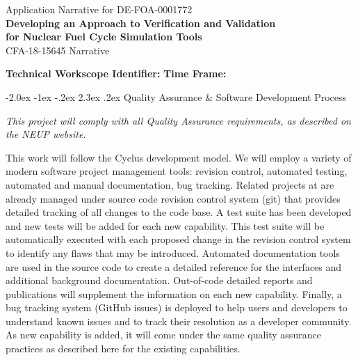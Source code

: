 \documentclass[dvips,12pt]{article}
\makeatletter
\renewcommand\section{\@startsection {section}{1}{\z@}%
                                   {-2.0ex \@plus -1ex \@minus -.2ex}%
                                   {2.3ex \@plus.2ex}%
                                   {\normalfont\bfseries}}%
\makeatother
\begin{document}
\begin{centering} Application Narrative for
  DE-FOA-0001772\\
  \textbf{\large Developing an Approach to Verification and Validation\\ for Nuclear Fuel Cycle Simulation Tools}\\
  CFA-18-15645 Narrative\\
\end{centering}

\vspace{1em}

\noindent\textbf{Technical Workscope Identifier:}  \hspace{1.5in}
\textbf{Time Frame:}







%

\section{Quality Assurance \& Software Development Process}

\textit{This project will comply with all Quality Assurance requirements, as
described on the NEUP website.}

This work will follow the Cyclus development model.  We will employ a variety of
modern software project management tools: revision control, automated testing,
automated and manual documentation, bug tracking. Related projects at are
already managed under source code revision control system (git) that provides
detailed tracking of all changes to the code base. A test suite has been
developed and new tests will be added for each new capability. This test suite
will be automatically executed with each proposed change in the revision control
system to identify any flaws that may be introduced. Automated documentation
tools are used in the source code to create a detailed reference for the
interfaces and additional background documentation. Out-of-code detailed reports
and publications will supplement the information on each new capability.
Finally, a bug tracking system (GitHub issues) is deployed to help users and
developers to understand known issues and to track their resolution as a
developer community. As new capability is added, it will come under the same
quality assurance practices as described here for the existing capabilities.







\label{LastPage} 
\end{document}
